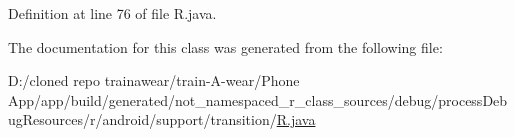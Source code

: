 Definition at line 76 of file R.\+java.



The documentation for this class was generated from the following file\+:\begin{DoxyCompactItemize}
\item 
D\+:/cloned repo trainawear/train-\/\+A-\/wear/\+Phone App/app/build/generated/not\+\_\+namespaced\+\_\+r\+\_\+class\+\_\+sources/debug/process\+Debug\+Resources/r/android/support/transition/\mbox{\hyperlink{process_debug_resources_2r_2android_2support_2transition_2_r_8java}{R.\+java}}\end{DoxyCompactItemize}
